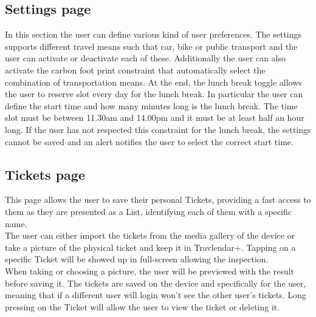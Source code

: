 \subsection*{Settings page}
In this section the user can define various kind of user preferences. The settings supports different travel means such that car, bike or public transport and the user can activate or deactivate each of these.
Additionally the user can also activate the carbon foot print constraint that automatically select the combination of transportation means.
At the end, the lunch break toggle allows the user to reserve slot every day for the lunch break. In particular the user can define the start time and how many minutes long is the lunch break. The time slot must be between 11.30am and 14.00pm and it must be at least half an hour long. 
If the user has not respected this constraint for the lunch break, the settings cannot be saved and an alert notifies the user to select the correct start time.

\subsection*{Tickets page}
This page allows the user to save their personal Tickets, providing a fast access to them as they are presented as a List, identifying each of them with a specific name.\\
The user can either import the tickets from the media gallery of the device or take a picture of the physical ticket and keep it in Travlendar+.
Tapping on a specific Ticket will be showed up in full-screen allowing the inspection.\\
When taking or choosing a picture, the user will be previewed with the result before saving it. 
The tickets are saved on the device and specifically for the user, meaning that if a different user will login won't see the other user's tickets.
Long pressing on the Ticket will allow the user to view the ticket or deleting it.







